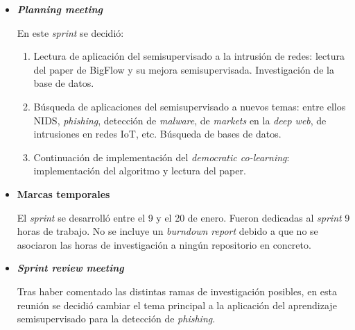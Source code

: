\begin{itemize}
	\item \textbf{\textit{Planning meeting}}
	
	En este \textit{sprint} se decidió:
	\begin{enumerate}
		\item Lectura de aplicación del semisupervisado a la intrusión de redes: lectura del paper de BigFlow y su mejora semisupervisada. Investigación de la base de datos.
		\item Búsqueda de aplicaciones del semisupervisado a nuevos temas: entre ellos NIDS, \textit{phishing}, detección de \textit{malware}, de \textit{markets} en la \textit{deep web}, de intrusiones en redes IoT, etc. Búsqueda de bases de datos.
		\item Continuación de implementación del \textit{democratic co-learning}: implementación del algoritmo y lectura del paper.
	\end{enumerate}
	\item \textbf{Marcas temporales}		
	
	El \textit{sprint} se desarrolló entre el 9 y el 20 de enero. Fueron dedicadas al \textit{sprint} 9 horas de trabajo. No se incluye un \textit{burndown report} debido a que no se asociaron las horas de investigación a ningún repositorio en concreto.
	
	\item \textbf{\textit{Sprint review meeting}}
	
	Tras haber comentado las distintas ramas de investigación posibles, en esta reunión se decidió cambiar el tema principal a la aplicación del aprendizaje semisupervisado para la detección de \textit{phishing}.
\end{itemize}


